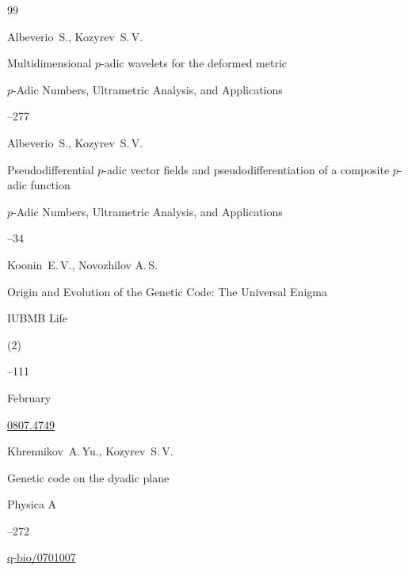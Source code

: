 \begin{thebibliography}{99}






\by Albeverio~S., Kozyrev~S.\,V.

\paper Multidimensional $p$-adic wavelets for the deformed metric

\jour $p$-Adic Numbers, Ultrametric Analysis, and Applications




--277




\by Albeverio~S., Kozyrev~S.\,V.

\paper Pseudodifferential $p$-adic vector fields and pseudodifferentiation of a composite $p$-adic function

\jour $p$-Adic Numbers, Ultrametric Analysis, and Applications




--34




\by Koonin~E.\,V.,  Novozhilov A.\,S.

\paper Origin and Evolution of the Genetic Code: The Universal Enigma

\jour IUBMB Life

(2)

–111

\monthissue February 


\arxiv \href{http://arxiv.org/abs/0807.4749}{0807.4749}






\by  Khrennikov~A.\,Yu.,  Kozyrev~S.\,V.

\paper Genetic code on the dyadic plane

\jour Physica A



--272

\arxiv \href{http://arxiv.org/abs/q-bio/0701007}{q-bio/0701007} 






\end{thebibliography}
